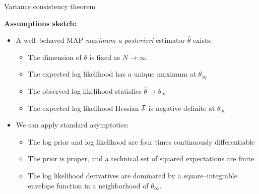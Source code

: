 \begin{frame}[t]{Variance consistency theorem}

    
\def\thetatrue{\theta_{\infty}}
\def\thetahat{\hat\theta}


\def\normdist{\mathcal{N}}

\def\gcovtrue{V^g}

\textbf{Assumptions sketch:}
%
\begin{itemize}
    \item A well--behaved MAP \textit{maximum a posteriori} estimator $\thetahat$ exists:
    \begin{itemize}
        \item The dimension of $\theta$ is fixed as $N \rightarrow \infty$.
        \item The expected log likelihood has a unique maximum at $\thetatrue$
        \item The observed log likelihood statisfies $\thetahat \rightarrow \thetatrue$
        \item The expected log likelihood Hessian $\mathcal{I}$ is negative definite at $\thetatrue$ 
    \end{itemize}
    \item We can apply standard asymptotics:
    \begin{itemize}
    \item The log prior and log likelihood are four times continuously differentiable
    \item The prior is proper, and a technical set of squared expectations are finite
    \item The log likelihood derivatives are dominated by a square--integrable envelope function in a
          neighborhood of $\theta_\infty$.
    \end{itemize}
\end{itemize}
%
\pause


\end{frame}
